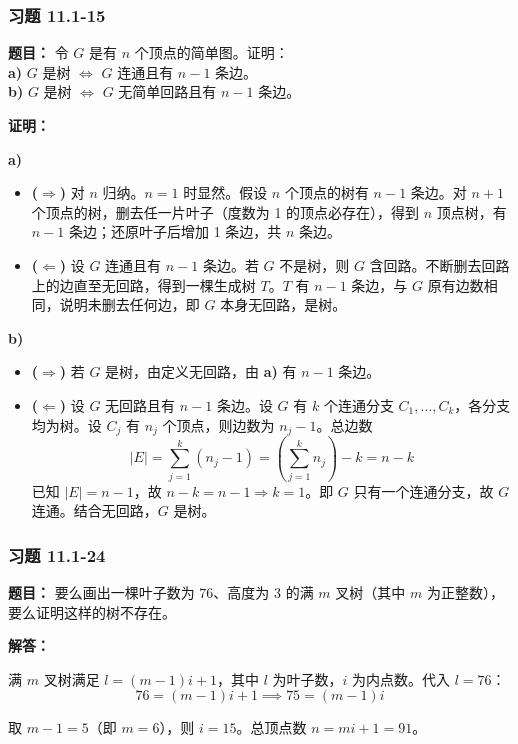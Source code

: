 \documentclass[11pt,UTF8]{article}
\begin{document}
\subsubsection*{习题 11.1-15}
\textbf{题目：} 令 $G$ 是有 $n$ 个顶点的简单图。证明：\\
\textbf{a)} $G$ 是树 $\iff$ $G$ 连通且有 $n-1$ 条边。\\
\textbf{b)} $G$ 是树 $\iff$ $G$ 无简单回路且有 $n-1$ 条边。

\textbf{证明：}

\textbf{a)} 
\begin{itemize}
    \item \textbf{($\Rightarrow$)} 对 $n$ 归纳。$n=1$ 时显然。假设 $n$ 个顶点的树有 $n-1$ 条边。对 $n+1$ 个顶点的树，删去任一片叶子（度数为 1 的顶点必存在），得到 $n$ 顶点树，有 $n-1$ 条边；还原叶子后增加 1 条边，共 $n$ 条边。
    \item \textbf{($\Leftarrow$)} 设 $G$ 连通且有 $n-1$ 条边。若 $G$ 不是树，则 $G$ 含回路。不断删去回路上的边直至无回路，得到一棵生成树 $T$。$T$ 有 $n-1$ 条边，与 $G$ 原有边数相同，说明未删去任何边，即 $G$ 本身无回路，是树。
\end{itemize}

\textbf{b)}
\begin{itemize}
    \item \textbf{($\Rightarrow$)} 若 $G$ 是树，由定义无回路，由 \textbf{a)} 有 $n-1$ 条边。
    \item \textbf{($\Leftarrow$)} 设 $G$ 无回路且有 $n-1$ 条边。设 $G$ 有 $k$ 个连通分支 $C_1,\dots,C_k$，各分支均为树。设 $C_j$ 有 $n_j$ 个顶点，则边数为 $n_j-1$。总边数
    \[ |E| = \sum_{j=1}^k (n_j-1) = \left(\sum_{j=1}^k n_j\right) - k = n - k \]
    已知 $|E| = n-1$，故 $n-k = n-1 \Rightarrow k=1$。即 $G$ 只有一个连通分支，故 $G$ 连通。结合无回路，$G$ 是树。
\end{itemize}

\subsubsection*{习题 11.1-24}
\textbf{题目：} 要么画出一棵叶子数为 $76$、高度为 $3$ 的满 $m$ 叉树（其中 $m$ 为正整数），要么证明这样的树不存在。

\textbf{解答：}

满 $m$ 叉树满足 $l = (m-1)i + 1$，其中 $l$ 为叶子数，$i$ 为内点数。代入 $l=76$：
\[ 76 = (m-1)i + 1 \implies 75 = (m-1)i \]

取 $m-1=5$（即 $m=6$），则 $i=15$。总顶点数 $n = mi + 1 = 91$。
\end{document}
